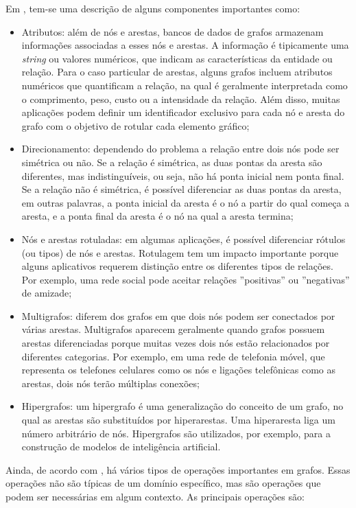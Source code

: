 Em \cite{dominguez}, tem-se uma descrição de alguns componentes importantes como:

\begin{itemize}
\item Atributos: além de nós e arestas, bancos de dados de grafos armazenam informações associadas a esses nós e arestas. A informação é tipicamente uma \textit{string} ou valores numéricos, que indicam as características da entidade ou relação. Para o caso particular de arestas, alguns grafos incluem atributos numéricos que quantificam a relação, na qual é geralmente interpretada como o comprimento, peso, custo ou a intensidade da relação. Além disso, muitas aplicações podem definir um identificador exclusivo para cada nó e aresta do grafo com o objetivo de rotular cada elemento gráfico;
\item Direcionamento: dependendo do problema a relação entre dois nós pode ser simétrica ou não. Se a relação é simétrica, as duas pontas da aresta são diferentes, mas indistinguíveis, ou seja, não há ponta inicial nem ponta final. Se a relação não é simétrica, é possível diferenciar as duas pontas da aresta, em outras palavras, a ponta inicial da aresta é o nó a partir do qual começa a aresta, e a ponta final da aresta é o nó na qual a aresta termina;
\item Nós e arestas rotuladas: em algumas aplicações, é possível diferenciar rótulos (ou tipos) de nós e arestas. Rotulagem tem um impacto importante porque alguns aplicativos requerem distinção entre os diferentes tipos de relações. Por exemplo, uma rede social pode aceitar relações ''positivas'' ou ''negativas'' de amizade;
\item Multigrafos: diferem dos grafos em que dois nós podem ser conectados por várias arestas. Multigrafos aparecem geralmente quando grafos possuem arestas diferenciadas porque muitas vezes dois nós estão relacionados por diferentes categorias. Por exemplo, em uma rede de telefonia móvel, que representa os telefones celulares como os nós e ligações telefônicas como as arestas, dois nós terão múltiplas conexões;
\item Hipergrafos: um hipergrafo é uma generalização do conceito de um grafo, no qual as arestas são substituídos por hiperarestas. Uma hiperaresta liga um número arbitrário de nós. Hipergrafos são utilizados, por exemplo, para a construção de modelos de inteligência artificial.
\end{itemize}

Ainda, de acordo com \cite{dominguez}, há vários tipos de operações importantes em grafos. Essas operações não são típicas de um domínio específico, mas são operações que podem ser necessárias em algum contexto. As principais operações são:

